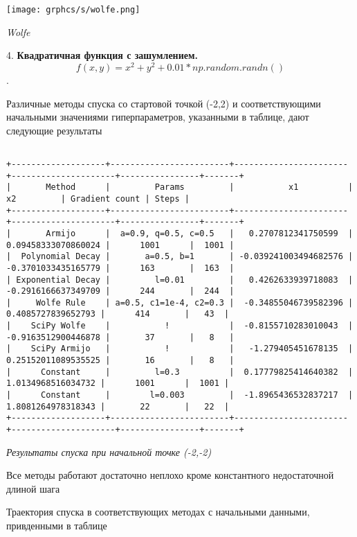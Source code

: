 \documentclass{article}
\begin{document}
\begin{center}
    \texttt{[image: grphcs/s/wolfe.png]}

    { \it Wolfe}
\end{center}



    4. { \bf Квадратичная функция с зашумлением. }
    $$ f(x, y) = x^2+y^2+ 0.01 * np.random.randn()$$.

Различные методы спуска со стартовой точкой (-2,2) и соответствующими начальными значениями гиперпараметров, указанными в таблице, дают следующие результаты


\begin{center}
{ \scriptsize
\begin{verbatim}

+-------------------+------------------------+-----------------------+---------------------+----------------+-------+
|       Method      |         Params         |           x1          |          x2         | Gradient count | Steps |
+-------------------+------------------------+-----------------------+---------------------+----------------+-------+
|       Armijo      |  a=0.9, q=0.5, c=0.5   |   0.2707812341750599  | 0.09458333070860024 |      1001      |  1001 |
|  Polynomial Decay |       a=0.5, b=1       | -0.039241003494682576 | -0.3701033435165779 |      163       |  163  |
| Exponential Decay |         l=0.01         |   0.4262633939718083  | -0.2916166637349709 |      244       |  244  |
|     Wolfe Rule    | a=0.5, c1=1e-4, c2=0.3 |  -0.34855046739582396 |  0.4085727839652793 |      414       |   43  |
|    SciPy Wolfe    |           !            |  -0.8155710283010043  | -0.9163512900446878 |       37       |   8   |
|    SciPy Armijo   |           !            |   -1.279405451678135  | 0.25152011089535525 |       16       |   8   |
|      Constant     |         l=0.3          |  0.17779825414640382  |  1.0134968516034732 |      1001      |  1001 |
|      Constant     |        l=0.003         |  -1.8965436532837217  |  1.8081264978318343 |       22       |   22  |
+-------------------+------------------------+-----------------------+---------------------+----------------+-------+
\end{verbatim}
}
{ \it Результаты спуска при начальной точке (-2,-2)

Все методы работают достаточно неплохо кроме константного недостаточной длиной шага}
\end{center}

Траектория спуска в соответствующих методах с начальными данными, привденными в таблице
\end{document}
